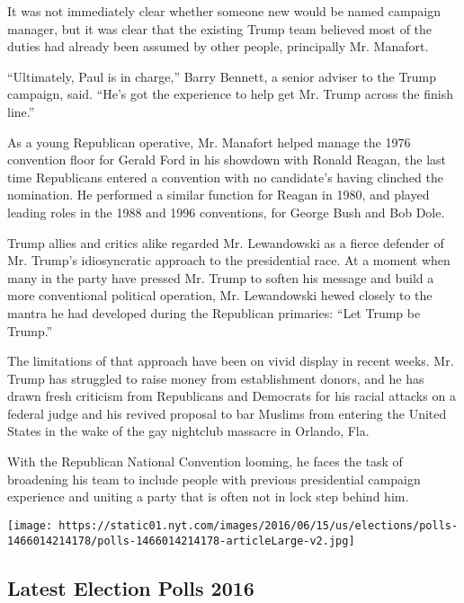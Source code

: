 It was not immediately clear whether someone new would be named campaign
manager, but it was clear that the existing Trump team believed most of
the duties had already been assumed by other people, principally Mr.
Manafort.

``Ultimately, Paul is in charge,'' Barry Bennett, a senior adviser to
the Trump campaign, said. ``He's got the experience to help get Mr.
Trump across the finish line.''

As a young Republican operative, Mr. Manafort helped manage the 1976
convention floor for Gerald Ford in his showdown with Ronald Reagan, the
last time Republicans entered a convention with no candidate's having
clinched the nomination. He performed a similar function for Reagan in
1980, and played leading roles in the 1988 and 1996 conventions, for
George Bush and Bob Dole.

Trump allies and critics alike regarded Mr. Lewandowski as a fierce
defender of Mr. Trump's idiosyncratic approach to the presidential race.
At a moment when many in the party have pressed Mr. Trump to soften his
message and build a more conventional political operation, Mr.
Lewandowski hewed closely to the mantra he had developed during the
Republican primaries: ``Let Trump be Trump.''

The limitations of that approach have been on vivid display in recent
weeks. Mr. Trump has struggled to raise money from establishment donors,
and he has drawn fresh criticism from Republicans and Democrats for his
racial attacks on a federal judge and his revived proposal to bar
Muslims from entering the United States in the wake of the gay nightclub
massacre in Orlando, Fla.

With the Republican National Convention looming, he faces the task of
broadening his team to include people with previous presidential
campaign experience and uniting a party that is often not in lock step
behind him.

\href{https://www.nytimes.com/interactive/2016/us/elections/polls.html}{}

\texttt{[image: https://static01.nyt.com/images/2016/06/15/us/elections/polls-1466014214178/polls-1466014214178-articleLarge-v2.jpg]}

\hypertarget{latest-election-polls-2016}{%
\subsection{Latest Election Polls
2016}\label{latest-election-polls-2016}}

